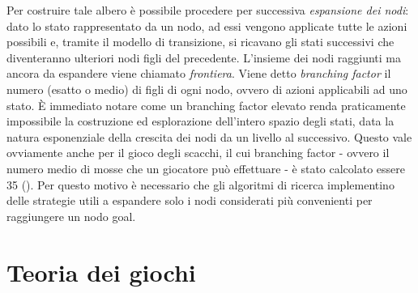 Per costruire tale albero è possibile procedere per successiva \emph{espansione dei nodi}: dato lo stato rappresentato da un nodo, ad essi vengono applicate tutte le azioni possibili e, tramite il modello di transizione, si ricavano gli stati successivi che diventeranno ulteriori nodi figli del precedente.
L'insieme dei nodi raggiunti ma ancora da espandere viene chiamato \emph{frontiera}.
Viene detto \emph{branching factor} il numero (esatto o medio) di figli di ogni nodo, ovvero di azioni applicabili ad uno stato.
È immediato notare come un branching factor elevato renda praticamente impossibile la costruzione ed esplorazione dell'intero spazio degli stati, data la natura esponenziale della crescita dei nodi da un livello al successivo.
Questo vale ovviamente anche per il gioco degli scacchi, il cui branching factor - ovvero il numero medio di mosse che un giocatore può effettuare - è stato calcolato essere 35 (\cite{chessbf}).
Per questo motivo è necessario che gli algoritmi di ricerca implementino delle strategie utili a espandere solo i nodi considerati più convenienti per raggiungere un nodo goal.


\section{Teoria dei giochi}





